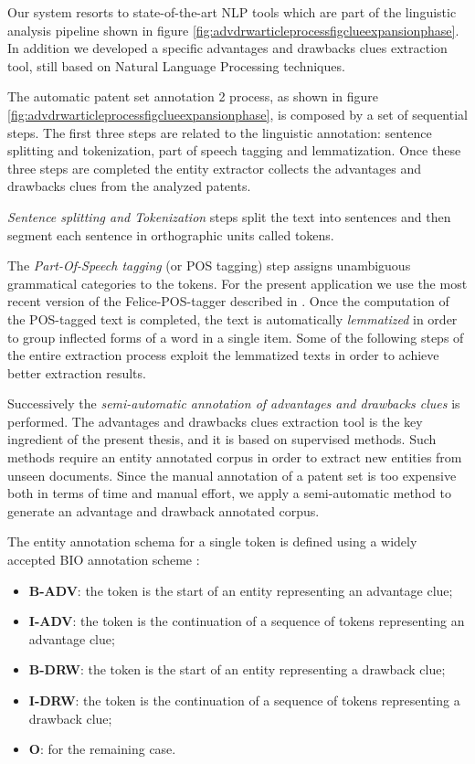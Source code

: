 \documentclass[b5paper,]{book}
\providecommand{\tightlist}{%
  \setlength{\itemsep}{0pt}\setlength{\parskip}{0pt}}
\theoremstyle{definition}
\theoremstyle{definition}
\theoremstyle{definition}
\theoremstyle{remark}
\begin{document}
Our system resorts to state-of-the-art NLP tools which are part of the
linguistic analysis pipeline shown in figure
\ref{fig:advdrwarticleprocessfigclueexpansionphase}. In addition we
developed a specific advantages and drawbacks clues extraction tool,
still based on Natural Language Processing techniques.

The automatic patent set annotation 2 process, as shown in figure
\ref{fig:advdrwarticleprocessfigclueexpansionphase}, is composed by a
set of sequential steps. The first three steps are related to the
linguistic annotation: sentence splitting and tokenization, part of
speech tagging and lemmatization. Once these three steps are completed
the entity extractor collects the advantages and drawbacks clues from
the analyzed patents.

\emph{Sentence splitting and Tokenization} steps split the text into
sentences and then segment each sentence in orthographic units called
tokens.

The \emph{Part-Of-Speech tagging} (or POS tagging) step assigns
unambiguous grammatical categories to the tokens. For the present
application we use the most recent version of the Felice-POS-tagger
described in \citep{dell2009ensemble}. Once the computation of the
POS-tagged text is completed, the text is automatically
\emph{lemmatized} in order to group inflected forms of a word in a
single item. Some of the following steps of the entire extraction
process exploit the lemmatized texts in order to achieve better
extraction results.

Successively the \emph{semi-automatic annotation of advantages and
drawbacks clues} is performed. The advantages and drawbacks clues
extraction tool is the key ingredient of the present thesis, and it is
based on supervised methods. Such methods require an entity annotated
corpus in order to extract new entities from unseen documents. Since the
manual annotation of a patent set is too expensive both in terms of time
and manual effort, we apply a semi-automatic method to generate an
advantage and drawback annotated corpus.

The entity annotation schema for a single token is defined using a
widely accepted BIO annotation scheme \citep{ramshaw}:

\begin{itemize}
\tightlist
\item
  \textbf{B-ADV}: the token is the start of an entity representing an
  advantage clue;
\item
  \textbf{I-ADV}: the token is the continuation of a sequence of tokens
  representing an advantage clue;
\item
  \textbf{B-DRW}: the token is the start of an entity representing a
  drawback clue;
\item
  \textbf{I-DRW}: the token is the continuation of a sequence of tokens
  representing a drawback clue;
\item
  \textbf{O}: for the remaining case.
\end{itemize}
\end{document}
